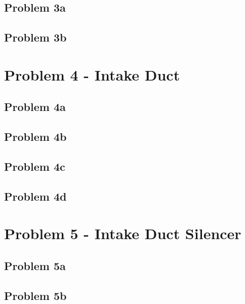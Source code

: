 \subsection*{Problem 3a}

\subsection*{Problem 3b}










\newpage
\section*{Problem 4 - Intake Duct}

\subsection*{Problem 4a}

\subsection*{Problem 4b}

\subsection*{Problem 4c}

\subsection*{Problem 4d}










\newpage
\section*{Problem 5 - Intake Duct Silencer}

\subsection*{Problem 5a}

\subsection*{Problem 5b}


